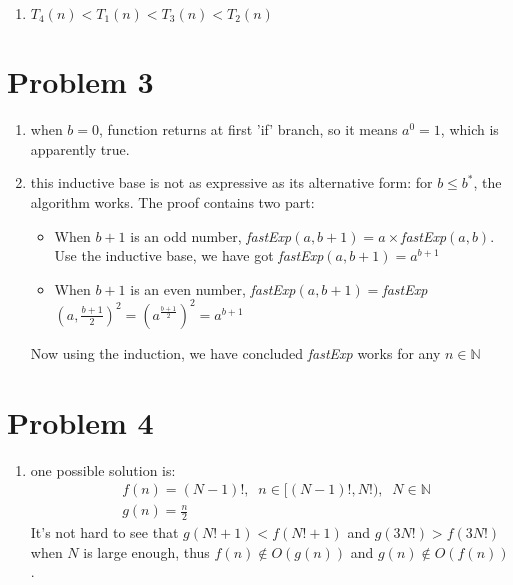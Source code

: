 \documentclass[paper=a4, fontsize=11pt]{scrartcl} %
\numberwithin{equation}{section} %
\numberwithin{figure}{section} %
\numberwithin{table}{section} %
\begin{document}
{\begin{enumerate}[label={2.(\alph*)}]
\begin{enumerate}[label={\roman*.}]
    \end{enumerate}

  \item $T_4(n) < T_1(n) < T_3(n) < T_2(n)$

\end{enumerate}


\section*{Problem 3}
\begin{enumerate}[label={3.\arabic*}]
  \item when $b=0$, function returns at first 'if' branch, so it means $a^0=1$, which is apparently true.

  \item this inductive base is not as expressive as its alternative form: for $b \leq b^*$, the algorithm works. The proof contains two part:
    \begin{itemize}
      \item When $b+1$ is an odd number, \textit{fastExp}$(a,b+1)=a\times$\textit{fastExp}$(a,b)$. Use the inductive base, we have got \textit{fastExp}$(a,b+1) = a^{b+1}$
      \item When $b+1$ is an even number, \textit{fastExp}$(a,b+1)=$\textit{fastExp}$(a, \frac{b+1}{2})^2= (a^{\frac{b+1}{2}})^2=a^{b+1}$ 
    \end{itemize}
    Now using the induction, we have concluded \textit{fastExp} works for any $n \in \mathbb{N}$

\end{enumerate}

\section*{Problem 4}
\begin{enumerate}[label={4.\arabic*}]
  \item one possible solution is:
    \begin{align*}
      & f(n) = (N-1)!, \;\;n \in [(N-1)!, N!),\;\;N \in \mathbb{N}\\
      & g(n) = \frac{n}{2}
    \end{align*}
    It's not hard to see that $g(N! + 1) < f(N! + 1)$ and $g(3N!) > f(3N!)$ when $N$ is large enough, thus
    $f(n) \notin O(g(n))$ and $g(n) \notin O(f(n))$.


\end{enumerate}}
\end{document}
